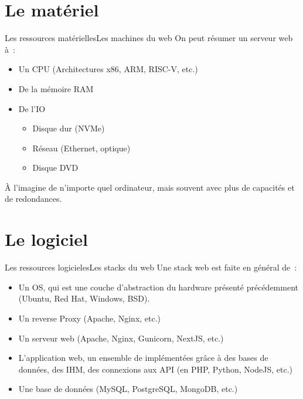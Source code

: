 \documentclass{beamer}
\begin{document}
    \section{Le matériel}\label{sec:le-materielle}

    \begin{frame}{Les ressources matérielles}{Les machines du web}
        On peut résumer un serveur web à~:
        \begin{itemize}
            \item Un CPU (Architectures x86, ARM, RISC-V, etc.)
            \item De la mémoire RAM
            \item De l'IO
            \begin{itemize}
                \item Disque dur (NVMe)
                \item Réseau (Ethernet, optique)
                \item Disque DVD
            \end{itemize}
        \end{itemize}
        À l'imagine de n'importe quel ordinateur, mais souvent avec plus de capacités et de redondances.
    \end{frame}


    \section{Le logiciel}\label{sec:le-logiciel}

    \begin{frame}{Les ressources logicieles}{Les stacks du web}
        Une stack web est faite en général de~:
        \begin{itemize}
            \item Un OS, qui est une couche d'abstraction du hardware présenté précédemment (Ubuntu, Red Hat, Windows, BSD).
            \item Un reverse Proxy (Apache, Nginx, etc.)
            \item Un serveur web (Apache, Nginx, Gunicorn, NextJS, etc.)
            \item L'application web, un ensemble de  implémentées grâce à des bases de données, des IHM, des connexions aux API (en PHP, Python, NodeJS, etc.)
            \item Une base de données (MySQL, PostgreSQL, MongoDB, etc.)
        \end{itemize}
    \end{frame}
\end{document}
